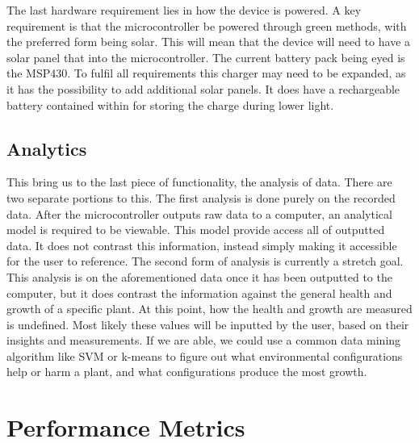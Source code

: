 \documentclass[IEEEtran,letterpaper,10pt,titlepage,fleqn,draftclsnofoot,onecolumn]{article}
\begin{document}
\vspace{5mm}

The last hardware requirement lies in how the device is powered. A key requirement is that the microcontroller be powered through green methods, with the preferred form being solar. This will mean that the device will need to have a solar panel that into the microcontroller. The current battery pack being eyed is the MSP430. To fulfil all requirements this charger may need to be expanded, as it has the possibility to add additional solar panels. It does have a rechargeable battery contained within for storing the charge during lower light.

\subsection{Analytics}

This bring us to the last piece of functionality, the analysis of data. There are two separate portions to this. The first analysis is done purely on the recorded data. After the microcontroller outputs raw data to a computer, an analytical model is required to be viewable. This model provide access all of outputted data. It does not contrast this information, instead simply making it accessible for the user to reference. The second form of analysis is currently a stretch goal. This analysis is on the aforementioned data once it has been outputted to the computer, but it does contrast the information against the general health and growth of a specific plant. At this point, how the health and growth are measured is undefined. Most likely these values will be inputted by the user, based on their insights and measurements. If we are able, we could use a common data mining algorithm like SVM or k-means to figure out what environmental configurations help or harm a plant, and what configurations produce the most growth. 

\vspace{5mm}

\section{Performance Metrics}
\end{document}
